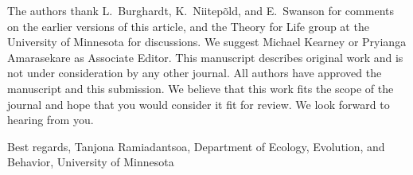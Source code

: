 %

The authors thank L.\ Burghardt, K.\ Niitep\~{o}ld, and E.\ Swanson for comments on the earlier versions of this article, and the Theory for Life group at the University of Minnesota for discussions.
We suggest Michael Kearney or Pryianga Amarasekare as Associate Editor.
This manuscript describes original work and is not under consideration by any other journal.
All authors have approved the manuscript and this submission.
We believe that this work fits the scope of the journal and hope that you would consider it fit for review.
We look forward to hearing from you.

Best regards,
Tanjona Ramiadantsoa,
Department of Ecology, Evolution, and Behavior, University of Minnesota
